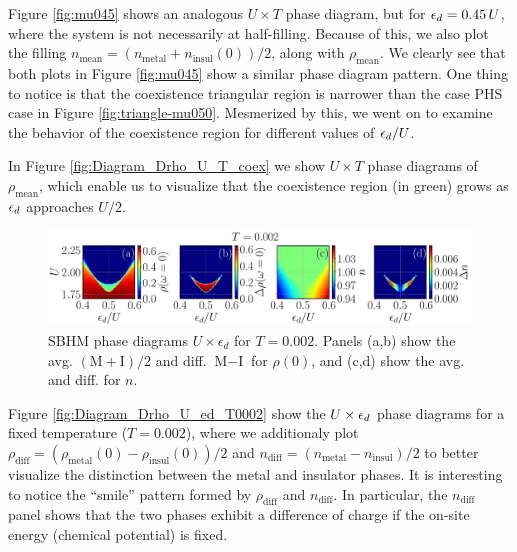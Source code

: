 \documentclass[12pt]{report}
\begin{document}
Figure \ref{fig:mu045} shows an analogous $U \times T$ phase diagram, but for $\epsilon_d = 0.45 \, U$, where the system is not necessarily at half-filling. Because of this, we also plot the filling $n_{\text{mean}} = (n_{\text{metal}} + n_{\text{insul}}(0))/2$, along with $\rho_{\text{mean}}$. We clearly see that both plots in Figure \ref{fig:mu045} show a similar phase diagram pattern. One thing to notice is that the coexistence triangular region is narrower than the case PHS case in Figure \ref{fig:triangle-mu050}. Mesmerized by this, we went on to examine the behavior of the coexistence region for different values of $\epsilon_d/U$.


In Figure \ref{fig:Diagram_Drho_U_T_coex} we show $U \times T$ phase diagrams of $\rho_{\text{mean}}$, which enable us to visualize that the coexistence region (in green) grows as $\epsilon_d$ approaches $U/2$.



\begin{figure}[H]
\centering
\includegraphics[width=\columnwidth]{Figs/fig4-abcd-eps-converted-to.pdf}
\caption{SBHM phase diagrams $U \times \epsilon_d$ for $T=0.002$. Panels (a,b) show the avg. $(\text{M}+\text{I})/2$ and diff. $\text{M}-\text{I}$ for $\rho(0)$, and (c,d) show the avg. and diff. for $n$. }
\label{fig:Diagram_Drho_U_ed_T0002_T0004}
\end{figure}




Figure \ref{fig:Diagram_Drho_U_ed_T0002} show the $U \times \epsilon_d$ phase diagrams for a fixed temperature ($T = 0.002$), where we additionaly plot $\rho_{\text{diff}} = (\rho_{\text{metal}}(0) - \rho_{\text{insul}}(0))/2$ and $n_{\text{diff}} = (n_{\text{metal}} - n_{\text{insul}})/2$ to better visualize the distinction between the metal and insulator phases. It is interesting to notice the ``smile'' pattern formed by $\rho_{\text{diff}}$ and $n_{\text{diff}}$. In particular, the $n_{\text{diff}}$ panel shows that the two phases exhibit a difference of charge if the on-site energy (chemical potential) is fixed.
\end{document}
